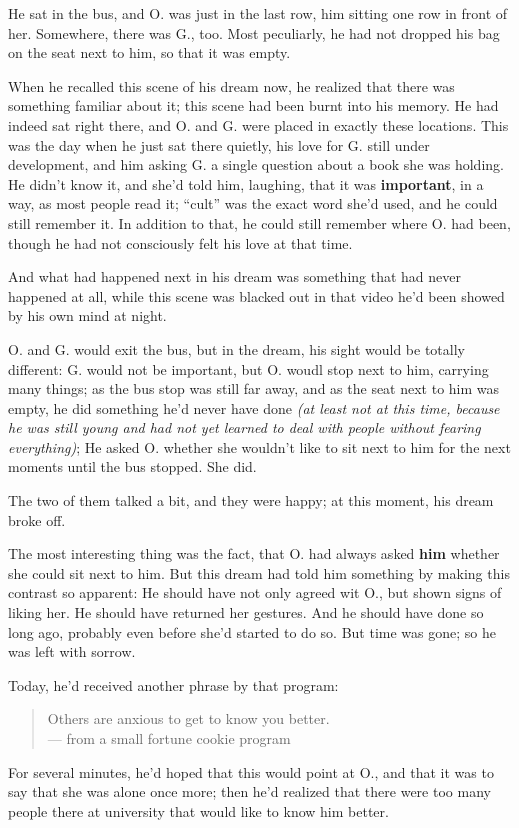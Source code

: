 He sat in the bus, and O. was just in the last row, him sitting one row in front of her. Somewhere, there was G., too. Most peculiarly, he had not dropped his bag on the seat next to him, so that it was empty.

When he recalled this scene of his dream now, he realized that there was something familiar about it; this scene had been burnt into his memory. He had indeed sat right there, and O. and G. were placed in exactly these locations. This was the day when he just sat there quietly, his love for G. still under development, and him asking G. a single question about a book she was holding. He didn't know it, and she'd told him, laughing, that it was \textbf{important}, in a way, as most people read it; \enquote{cult} was the exact word she'd used, and he could still remember it. In addition to that, he could still remember where O. had been, though he had not consciously felt his love at that time.

And what had happened next in his dream was something that had never happened at all, while this scene was blacked out in that video he'd been showed by his own mind at night.

O. and G. would exit the bus, but in the dream, his sight would be totally different: G. would not be important, but O. woudl stop next to him, carrying many things; as the bus stop was still far away, and as the seat next to him was empty, he did something he'd never have done \emph{(at least not at this time, because he was still young and had not yet learned to deal with people without fearing everything)}; He asked O. whether she wouldn't like to sit next to him for the next moments until the bus stopped.
She did.

The two of them talked a bit, and they were happy; at this moment, his dream broke off.

The most interesting thing was the fact, that O. had always asked \textbf{him} whether she could sit next to him. But this dream had told him something by making this contrast so apparent: He should have not only agreed wit O., but shown signs of liking her. He should have returned her gestures. And he should have done so long ago, probably even before she'd started to do so. 
But time was gone; so he was left with sorrow.

Today, he'd received another phrase by that program: 
\begin{verse}
Others are anxious to get to know you better. \\
--- from a small fortune cookie program
\end{verse}
For several minutes, he'd hoped that this would point at O., and that it was to say that she was alone once more; then he'd realized that there were too many people there at university that would like to know him better.

